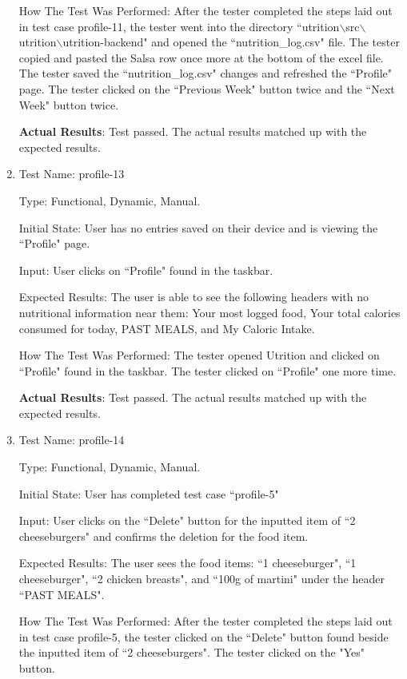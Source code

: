 \documentclass[12pt, titlepage]{article}
\begin{document}
\begin{enumerate}
		How The Test Was Performed: After the tester completed the steps laid out in test case profile-11, the tester went into the directory ``utrition$\backslash$src$\backslash$utrition$\backslash$utrition-backend" and opened the ``nutrition\_log.csv" file. The tester copied and pasted the Salsa row once more at the bottom of the excel file. The tester saved the ``nutrition\_log.csv" changes and refreshed the ``Profile" page. The tester clicked on the ``Previous Week" button twice and the ``Next Week" button twice.
		
		\textbf{Actual Results}: Test passed. The actual results matched up with the expected results.
		
		\item{Test Name: profile-13}
		
		Type: Functional, Dynamic, Manual.
		
		Initial State: User has no entries saved on their device and is viewing the ``Profile" page.
		
		Input: User clicks on ``Profile" found in the taskbar.
		
		Expected Results: The user is able to see the following headers with no nutritional information near them: Your most logged food, Your total calories consumed for today, PAST MEALS, and My Caloric Intake.
		
		How The Test Was Performed: The tester opened Utrition and clicked on ``Profile" found in the taskbar. The tester clicked on ``Profile" one more time.
		
		\textbf{Actual Results}: Test passed. The actual results matched up with the expected results.
		
		\item{Test Name: profile-14}
		
		Type: Functional, Dynamic, Manual.
		
		Initial State: User has completed test case ``profile-5"
		
		Input: User clicks on the ``Delete" button for the inputted item of ``2 cheeseburgers" and confirms the deletion for the food item.
		
		Expected Results: The user sees the food items: ``1 cheeseburger", ``1 cheeseburger", ``2 chicken breasts", and ``100g of martini" under the header ``PAST MEALS".
		
		How The Test Was Performed: After the tester completed the steps laid out in test case profile-5, the tester clicked on the ``Delete" button found beside the inputted item of ``2 cheeseburgers". The tester clicked on the "Yes" button.
		

\end{enumerate}
\end{document}

